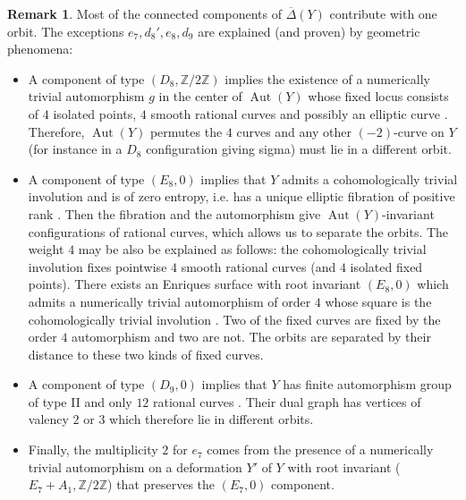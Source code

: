 \documentclass[a4paper]{amsart}
\theoremstyle{definition}
\newtheorem{remark}[definition]{Remark}
\theoremstyle{plain}
\DeclareMathOperator{\Aut}{Aut}
\newcommand{\ZZ}{\mathbb{Z}}
\begin{document}
\begin{remark}
Most of the connected components of $\overline{\Delta}(Y)$ contribute with one orbit. The exceptions $e_7, d_8',e_8,d_9$ are explained (and proven) by geometric phenomena:

\begin{itemize}
\item A component of type $(D_8, \ZZ/2\ZZ)$ implies the existence of a numerically trivial automorphism $g$ in the center of $\Aut(Y)$ whose fixed locus consists of $4$ isolated points, $4$ smooth rational curves and possibly an elliptic curve \cite[Table 8.8,Theorem 8.2.21, Remark 8.2.22]{enriquesII}. Therefore, $\Aut(Y)$ permutes the $4$ curves and any other $(-2)$-curve on $Y$ (for instance in a $D_8$ configuration giving sigma) must lie in a different orbit. 

\item A component of type $(E_8, 0)$ implies that $Y$ admits a cohomologically trivial involution and is of zero entropy, i.e. has a unique elliptic fibration of positive rank \cite{martin2024enriquessurfaceszeroentropy}. Then the fibration and the automorphism give $\Aut(Y)$-invariant configurations of rational curves, which allows us to separate the orbits. The weight $4$ may be also be explained as follows: the cohomologically trivial involution fixes pointwise $4$ smooth rational curves (and $4$ isolated fixed points). 
There exists an Enriques surface with root invariant $(E_8,0)$ which admits a numerically trivial automorphism of order $4$ whose square is the cohomologically trivial involution \cite[Theorem 8.2.23]{enriquesII}.
Two of the fixed curves are fixed by the order $4$ automorphism and two are not. The orbits are separated by their distance to these two kinds of fixed curves.

\item A component of type $(D_9, 0)$ implies that $Y$ has finite automorphism group of type II and only $12$ rational curves \cite[Main Theorem]{kondo:enriques_finite_automorphism}. Their dual graph has vertices of valency $2$ or $3$ which therefore lie in different orbits.

\item Finally, the multiplicity $2$ for $e_7$ comes from the presence of a numerically trivial automorphism on a deformation $Y'$ of $Y$ with root invariant ($E_7+A_1,\ZZ/2\ZZ$) that preserves the $(E_7, 0)$ component. 
\end{itemize}
\end{remark}
\end{document}

